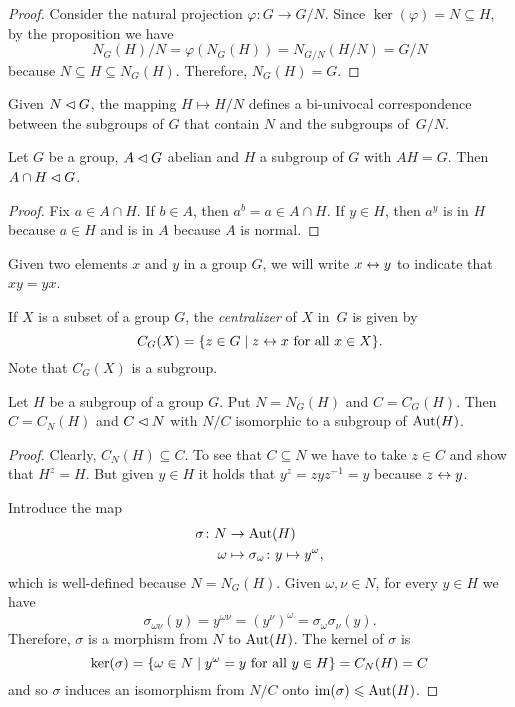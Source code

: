 \begin{proof} Consider the natural projection $\varphi\colon G\to G/N$. Since $\ker(\varphi)=N\subseteq H$, by the proposition we have
$$
    N_G(H)/N=\varphi(N_G(H))=N_{G/N}(H/N)=G/N
$$
because $N\subseteq H\subseteq N_G(H)$. Therefore, $N_G(H)=G$.  \end{proof}

\begin{rem}\label{biunivocal-normal-quotient}
    Given\/ $N\lhd G$, the mapping\/ $H\mapsto H/N$ defines a bi-univocal correspondence between the subgroups of\/ $G$ that contain\/ $N$ and the subgroups of\/~$G/N$.
\end{rem}

\begin{prop}\label{intersect-abelian-normal-get-normal}
    Let\/ $G$ be a group, $A\lhd G$ abelian and\/ $H$ a subgroup of $G$ with $AH=G$. Then\/ $A\cap H\lhd G$.
\end{prop}

\begin{proof} Fix $a\in A\cap H$. If $b\in A$, then $a^b=a\in A\cap H$. If $y\in H$, then $a^y$ is in $H$ because $a\in H$ and is in $A$ because $A$ is normal.  \end{proof}

\begin{ntn}
    Given two elements $x$ and $y$ in a group $G$, we will write $x\mathrel\leftrightarrow y$ to indicate that\/ $xy=yx$.
\end{ntn}

\begin{defn}
    If $X$ is a subset of a group $G$, the \textsl{centralizer} of\/ $X$ in\/~$G$ is given by
    $$
        C_G(X) = \{z\in G\mid z\mathrel\leftrightarrow x \textrm{\rm\ for all }x\in X\}.
    $$
    Note that $C_G(X)$ is a subgroup.
\end{defn}

\begin{cor}
    Let $H$ be a subgroup of a group $G$. Put $N = N_G(H)$ and\/ $C = C_G(H)$. Then\/ $C=C_N(H)$ and\/ $C \lhd N$ with $N/C$ isomorphic to a subgroup of ${\rm Aut}(H)$.
\end{cor}

\begin{proof}

Clearly, $C_N(H)\subseteq C$. To see that $C\subseteq N$ we have to take $z\in C$ and show that $H^z=H$. But given $y\in H$ it holds that $y^z=zyz^{-1}=y$ because $z\mathrel\leftrightarrow y$.

Introduce the map
\begin{align*}
    \sigma\colon N&\to{\rm Aut}(H)\\
    \omega&\mapsto\sigma_\omega\colon y\mapsto y^\omega,
\end{align*}
which is well-defined because $N=N_G(H)$. Given $\omega,\nu\in N$, for every $y\in H$ we have
$$
    \sigma_{\omega\nu}(y)
        =y^{\omega\nu}=(y^\nu)^\omega = \sigma_\omega\sigma_\nu(y).
$$
Therefore, $\sigma$ is a morphism from $N$ to ${\rm Aut}(H)$. The kernel of $\sigma$ is
$$
    \ker(\sigma) = \{\omega\in N\mid y^\omega = y\textrm{\rm\ for all }y\in H\}
        = C_N(H) = C
$$
and so $\sigma$ induces an isomorphism from $N/C$ onto $\operatorname{im}(\sigma)\leqslant{\rm Aut}(H)$.  \end{proof}



